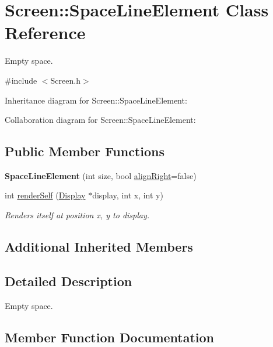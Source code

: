 \hypertarget{classScreen_1_1SpaceLineElement}{}\section{Screen\+:\+:Space\+Line\+Element Class Reference}
\label{classScreen_1_1SpaceLineElement}


Empty space.  




{\ttfamily \#include $<$Screen.\+h$>$}



Inheritance diagram for Screen\+:\+:Space\+Line\+Element\+:


Collaboration diagram for Screen\+:\+:Space\+Line\+Element\+:
\subsection*{Public Member Functions}
\begin{DoxyCompactItemize}
\item 
\mbox{\label{classScreen_1_1SpaceLineElement_a5049df7e0470c0c6b2da96cbb3be2e31}} 
{\bfseries Space\+Line\+Element} (int size, bool \mbox{\hyperlink{classScreen_1_1LineElement_a0c5f4e33c2df1dce8e4e45b90dac1423}{align\+Right}}=false)
\item 
int \mbox{\hyperlink{classScreen_1_1SpaceLineElement_a897336996ddbfbb7c86bb6ef9acb8536}{render\+Self}} (\mbox{\hyperlink{classDisplay}{Display}} $\ast$display, int x, int y)
\begin{DoxyCompactList}\small\item\em Renders itself at position x, y to display. \end{DoxyCompactList}\end{DoxyCompactItemize}
\subsection*{Additional Inherited Members}


\subsection{Detailed Description}
Empty space. 

\subsection{Member Function Documentation}
\mbox{\label{classScreen_1_1SpaceLineElement_a897336996ddbfbb7c86bb6ef9acb8536}} 

